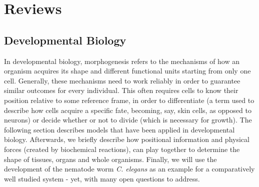\documentclass[fleqn,10pt]{wlscirep}
\begin{document}
\section*{Reviews}


% 
%
\subsection*{Developmental Biology}

In developmental biology, morphogenesis refers to the mechanisms of how an organism acquires its shape and different functional units starting from only one cell. Generally, these mechanisms need to work reliably in order to guarantee similar outcomes for every individual. This often requires cells to know their position relative to some reference frame, in order to differentiate (a term used to describe how cells acquire a specific fate, becoming, say, skin cells, as opposed to neurons) or decide whether or not to divide (which is necessary for growth). The following section describes models that have been applied in developmental biology.
Afterwards, we briefly describe how positional information and physical forces (created by biochemical reactions), can play together to determine the shape of tissues, organs and whole organisms. Finally, we will use the development of the nematode worm \textit{C. elegans} as an example for a comparatively well studied system - yet, with many open questions to address.
\end{document}
